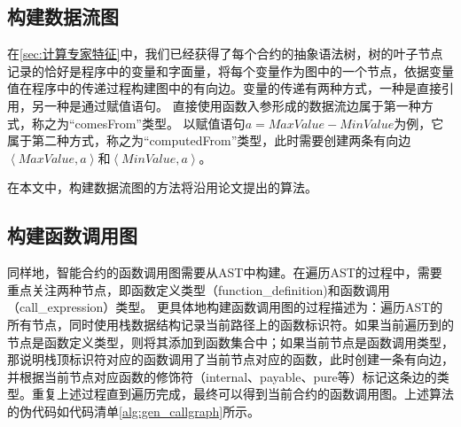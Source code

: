 \subsection{构建数据流图}
\label{sec:构建数据流图}
在\autoref{sec:计算专家特征}中，我们已经获得了每个合约的抽象语法树，树的叶子节点记录的恰好是程序中的变量和字面量，将每个变量作为图中的一个节点，依据变量值在程序中的传递过程构建图中的有向边。变量的传递有两种方式，一种是直接引用，另一种是通过赋值语句。
直接使用函数入参形成的数据流边属于第一种方式，称之为“comesFrom”类型。
以赋值语句$a=MaxValue-MinValue$为例，它属于第二种方式，称之为“computedFrom”类型，此时需要创建两条有向边$\left\langle MaxValue,a\right\rangle$和$\left\langle MinValue,a\right\rangle$。

在本文中，构建数据流图的方法将沿用论文\cite{wu2021peculiar}提出的算法。
\subsection{构建函数调用图}
\label{sec:构建函数调用图}
同样地，智能合约的函数调用图需要从AST中构建。在遍历AST的过程中，需要重点关注两种节点，即函数定义类型（function\_definition)和函数调用（call\_expression）类型。
更具体地构建函数调用图的过程描述为：遍历AST的所有节点，同时使用栈数据结构记录当前路径上的函数标识符。如果当前遍历到的节点是函数定义类型，则将其添加到函数集合中；如果当前节点是函数调用类型，那说明栈顶标识符对应的函数调用了当前节点对应的函数，此时创建一条有向边，并根据当前节点对应函数的修饰符（internal、payable、pure等）标记这条边的类型。重复上述过程直到遍历完成，最终可以得到当前合约的函数调用图。上述算法的伪代码如代码清单\ref{alg:gen_callgraph}所示。


